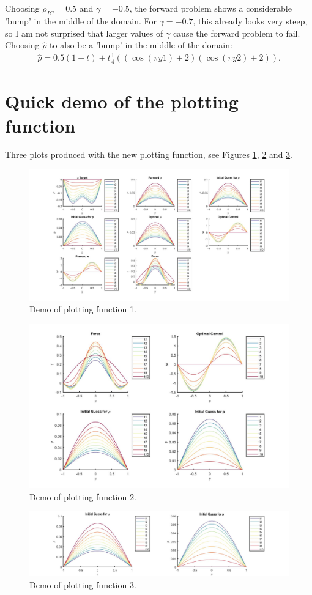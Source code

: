 \documentclass[11pt, a4paper]{article}
\theoremstyle{definition}
\begin{document}
\\
\\
Choosing $\rho_{IC}=0.5$ and $\gamma =-0.5$, the forward problem shows a considerable 'bump' in the middle of the domain. For $\gamma = -0.7$, this already looks very steep, so I am not surprised that larger values of $\gamma$ cause the forward problem to fail.\\
Choosing $\hat \rho$ to also be a 'bump' in the middle of the domain:
\begin{align*}
\hat \rho = 0.5(1-t) + t\frac{1}{4}((\cos(\pi y1)+2)(\cos(\pi y2)+2)).
\end{align*}
\section{Quick demo of the plotting function}
Three plots produced with the new plotting function, see Figures \ref{Demo1}, \ref{Demo2} and \ref{Demo3}.
\begin{figure}[h]
	\includegraphics[scale=0.3]{Demo1.jpg}
	\caption{Demo of plotting function 1.}
	\label{Demo1}
\end{figure}
\begin{figure}[h]
	\includegraphics[scale=0.3]{Demo2.jpg}
	\caption{Demo of plotting function 2.}
	\label{Demo2}
\end{figure}
\begin{figure}[h]
	\includegraphics[scale=0.3]{Demo3.jpg}
	\caption{Demo of plotting function 3.}
	\label{Demo3}
\end{figure}
\end{document}
